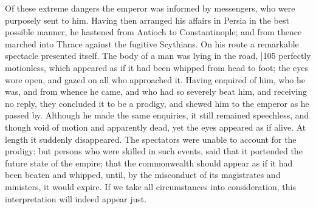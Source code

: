 Of these extreme dangers the emperor was informed by messengers, who were purposely sent to him. Having then arranged his affairs in Persia in the best possible manner, he hastened from Antioch to Constantinople; and from thence marched into Thrace against the fugitive Scythians. On his route a remarkable spectacle presented itself. The body of a man was lying in the road,
|105 perfectly motionless, which appeared as if it had been whipped from head to foot; the eyes wore open, and gazed on all who approached it. Having enquired of him, who he was, and from whence he came, and who had so severely beat him, and receiving no reply, they concluded it to be a prodigy, and shewed him to the emperor as he passed by. Although he made the same enquiries, it still remained speechless, and though void of motion and apparently dead, yet the eyes appeared as if alive. At length it suddenly disappeared. The spectators were unable to account for the prodigy; but persons who were skilled in such events, said that it portended the future state of the empire; that the commonwealth should appear as if it had been beaten and whipped, until, by the misconduct of its magistrates and ministers, it would expire. If we take all circumstances into consideration, this interpretation will indeed appear just.

